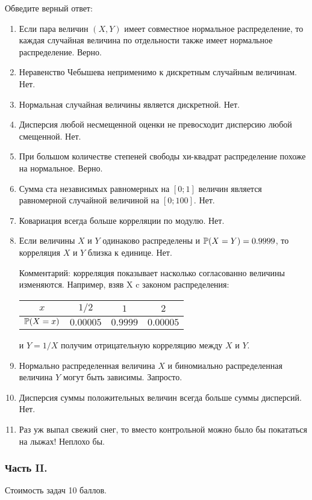 Обведите верный ответ:
\begin{enumerate}
\item Если пара величин $(X,Y)$ имеет совместное нормальное распределение, то каждая случайная величина по отдельности также имеет нормальное распределение. Верно.
\item Неравенство Чебышева неприменимо к дискретным случайным величинам. Нет.
\item Нормальная случайная величины является дискретной. Нет.
\item Дисперсия любой несмещенной оценки не превосходит дисперсию любой смещенной. Нет.
\item При большом количестве степеней свободы хи-квадрат распределение похоже на нормальное. Верно.
\item Сумма ста независимых равномерных на $[0;1]$ величин является равномерной случайной величиной на $[0;100]$. Нет.
\item Ковариация всегда больше корреляции по модулю.  Нет.
\item Если величины $X$ и $Y$ одинаково распределены и $\P(X=Y)=0.9999$, то корреляция $X$ и $Y$ близка к единице. Нет.

Комментарий: корреляция показывает насколько согласованно величины изменяются. Например, взяв X c законом распределения:
\begin{center}
\begin{tabular}{@{}cccc@{}}
\toprule
$x$         & $1/2$     & $1$      & $2$       \\ \midrule
$\P(X=x)$ & $0.00005$ & $0.9999$ & $0.00005$ \\ \bottomrule
\end{tabular}
\end{center}
и $Y=1/X$ получим отрицательную корреляцию между $X$ и $Y$.
\item Нормально распределенная величина $X$ и биномиально распределенная величина $Y$ могут быть зависимы. Запросто.
\item Дисперсия суммы положительных величин всегда больше суммы дисперсий. Нет.
\item Раз уж выпал свежий снег, то вместо контрольной можно
было бы покататься на лыжах! Неплохо бы.
\end{enumerate}

\subsubsection*{Часть II.}

Стоимость задач 10 баллов.

